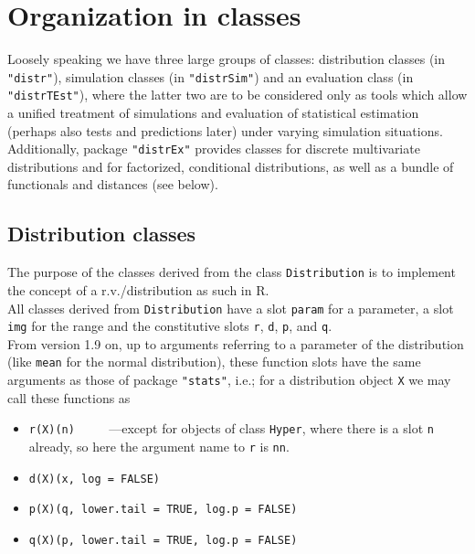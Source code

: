 \documentclass[11pt]{article}
\newcommand{\code}[1]{{\tt #1}}
\newcommand{\pkg}[1]{{\tt "#1"}}
\begin{document}
\section{Organization in classes}
Loosely speaking we have three large groups of classes: distribution classes (in 
\pkg{distr}), simulation classes (in \pkg{distrSim}) and an evaluation class (in 
\pkg{distrTEst}), where the latter two are to be considered only as tools which 
allow a unified treatment of simulations and evaluation of statistical estimation 
(perhaps also tests and predictions later) under varying simulation situations.
Additionally, package \pkg{distrEx} provides classes for discrete multivariate 
distributions and for factorized, conditional distributions, as well as a bundle 
of functionals and distances (see below).
\subsection{Distribution classes}
The purpose of the classes derived from the class \code{Distribution}  is to 
implement the concept of a r.v./distribution as such in {\sf R}.\\
All classes derived from \code{Distribution} have a slot \code{param} for a 
parameter, a slot \code{img} for the range and the constitutive slots \code{r}, 
\code{d}, \code{p}, and \code{q}.\\
From version 1.9 on, up to arguments referring to a parameter of the 
distribution (like \code{mean} for the normal distribution), these function 
slots have the same arguments as those of package \pkg{stats}, i.e.; for a 
distribution object \code{X} we may call these functions as 

\begin{itemize}
\item \code{r(X)(n)}  $\qquad$ ---except for objects of class \code{Hyper},
where there is a slot \code{n} already, so here the argument name 
to \code{r} is \code{nn}.
\item \code{d(X)(x, log = FALSE)}
\item \code{p(X)(q, lower.tail = TRUE, log.p = FALSE)}
\item \code{q(X)(p, lower.tail = TRUE, log.p = FALSE)}
\end{itemize}
\end{document}
